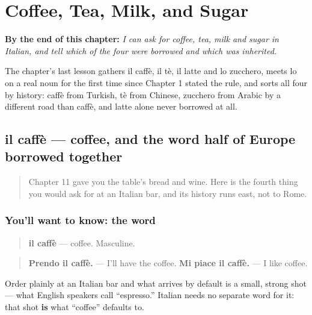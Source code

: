 
\chapter{Coffee, Tea, Milk, and Sugar}
\label{ch:it-coffee-tea-milk-sugar}

\begin{chapteropening}
\textbf{By the end of this chapter:} \emph{I can ask for coffee, tea, milk and sugar in Italian, and tell which of the four were borrowed and which was inherited.}

The chapter's last lesson gathers il caffè, il tè, il latte and lo zucchero, meets lo on a real noun for the first time since Chapter 1 stated the rule, and sorts all four by history: caffè from Turkish, tè from Chinese, zucchero from Arabic by a different road than caffè, and latte alone never borrowed at all.
\end{chapteropening}

\section[il caffè]{il caffè — coffee, and the word half of Europe borrowed together}

\label{lesson:IT-C22-caffe}



\begin{quote}
Chapter 11 gave you the table's bread and wine. Here is the fourth thing you would ask for at an Italian bar, and its history runs east, not to Rome.
\end{quote}

\subsection*{You'll want to know: the word}
\begin{quote}
\textbf{il caffè} — coffee. Masculine.
\end{quote}

\begin{quote}
\textbf{Prendo il caffè.} — I'll have the coffee. \textbf{Mi piace il caffè.} — I like coffee.
\end{quote}

Order plainly at an Italian bar and what arrives by default is a small, strong shot — what English speakers call \textquotedblleft{}espresso.\textquotedblright{} Italian needs no separate word for it: that shot \textbf{is} what \textquotedblleft{}coffee\textquotedblright{} defaults to.

